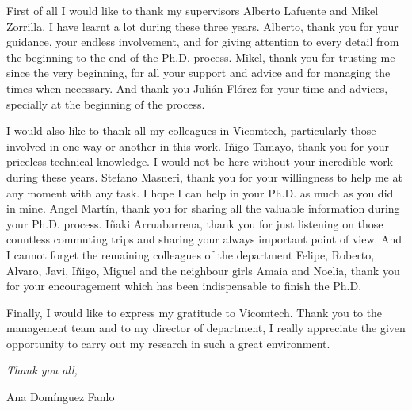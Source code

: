 


\begin{acknowledgements}      
First of all I would like to thank my supervisors Alberto Lafuente and Mikel Zorrilla. I have learnt a lot during these three years. Alberto, thank you for your guidance, your endless involvement, and for giving attention to every detail from the beginning to the end of the Ph.D. process. Mikel, thank you for trusting me since the very beginning, for all your support and advice and for managing the times when necessary. And thank you Julián Flórez for your time and advices, specially at the beginning of the process.

I would also like to thank all my colleagues in Vicomtech, particularly those involved in one way or another in this work. Iñigo Tamayo, thank you for your priceless technical knowledge. I would not be here without your incredible work during these years. Stefano Masneri, thank you for your willingness to help me at any moment with any task. I hope I can help in your Ph.D. as much as you did in mine. Angel Martín, thank you for sharing all the valuable information during your Ph.D. process. Iñaki Arruabarrena, thank you for just listening on those countless commuting trips and sharing your always important point of view. And I cannot forget the remaining colleagues of the department Felipe, Roberto, Alvaro, Javi, Iñigo, Miguel and the neighbour girls Amaia and Noelia, thank you for your encouragement which has been indispensable to finish the Ph.D.

Finally, I would like to express my gratitude to Vicomtech. Thank you to the management team and to my director of department, I really appreciate the given opportunity to carry out my research in such a great environment. 

\begin{flushright}
\textit{Thank you all,}

Ana Domínguez Fanlo

\monthname \ \the\year







\end{flushright}



\end{acknowledgements}



